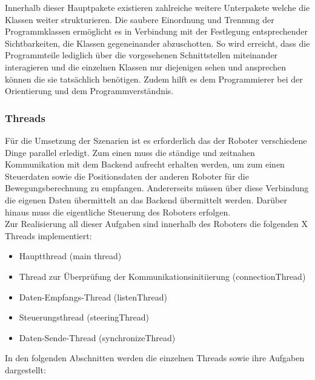 Innerhalb dieser Hauptpakete existieren zahlreiche weitere Unterpakete welche die Klassen weiter strukturieren. Die saubere Einordnung
und Trennung der Programmklassen ermöglicht es in Verbindung mit der Festlegung entsprechender Sichtbarkeiten, die Klassen gegeneinander 
abzuschotten. So wird erreicht, dass die Programmteile lediglich über die vorgesehenen Schnittstellen miteinander interagieren und die
einzelnen Klassen nur diejenigen sehen und ansprechen können die sie tatsächlich benötigen. Zudem hilft es dem Programmierer bei der 
Orientierung und dem Programmverständnis.
\subsubsection{Threads}
Für die Umsetzung der Szenarien ist es erforderlich das der Roboter verschiedene Dinge parallel erledigt. Zum einen muss die 
ständige und zeitnahen Kommunikation mit dem Backend aufrecht erhalten werden, um zum einen Steuerdaten sowie die Positionsdaten
der anderen Roboter für die Bewegungsberechnung zu empfangen. Andererseits müssen über diese Verbindung die eigenen Daten übermittelt
an das Backend übermittelt werden. Darüber hinaus muss die eigentliche Steuerung des Roboters erfolgen. \\
Zur Realisierung all dieser Aufgaben sind innerhalb des Roboters die folgenden X Threads implementiert:
\begin{itemize}
	\item{Hauptthread (main thread)}
	\item{Thread zur Überprüfung der Kommunikationsinitiierung (connectionThread)}
	\item{Daten-Empfangs-Thread (listenThread)}
	\item{Steuerungsthread (steeringThread)}
	\item{Daten-Sende-Thread (synchronizeThread)}
\end{itemize}
In den folgenden Abschnitten werden die einzelnen Threads sowie ihre Aufgaben dargestellt:
